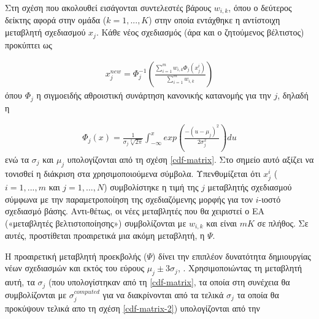 Στη σχέση που ακολουθεί εισάγονται συντελεστές βάρους $w_{i,k}$, όπου ο δεύτερος δείκτης αφορά στην ομάδα ($k=1,...,K$) στην οποία εντάχθηκε η αντίστοιχη μεταβλητή σχεδιασμού $x_j$. Κάθε νέος σχεδιασμός (άρα και ο ζητούμενος βέλτιστος) προκύπτει ως 

\begin{eqnarray}
   x_j^{new} = \Phi _j^{-1} (\frac{\sum_{i=1}^{m}w_{i,k} \Phi _j(x_j^i)}{\sum_{i=1}^{m}w_{i,k} }) 
   \label{non-linear2} 
\end{eqnarray}
όπου $\Phi_j$ η σιγμοειδής αθροιστική συνάρτηση κανονικής κατανομής για την $j$, δηλαδή η

\begin{eqnarray}
   \Phi _{j} (x)= \frac{1}{\sigma _j\sqrt[2]{2\pi}}\int _{-\infty}^x exp(\frac{-(u-\mu _j)^2}{2 \sigma _j^2 })du 
   \label{cdf} 
\end{eqnarray}
ενώ τα $\sigma _j$ και $\mu _j$ υπολογίζονται από τη σχέση \ref{cdf-matrix}. Στο σημείο αυτό αξίζει να τονισθεί η διάκριση στα χρησιμοποιούμενα σύμβολα. Υπενθυμίζεται ότι $x_j^i$ ($i=1,...,m$ και $j=1,...,N$) συμβολίστηκε η τιμή της $j$ μεταβλητής σχεδιασμού σύμφωνα με την παραμετροποίηση της  σχεδιαζόμενης μορφής για τον $i$-ιοστό σχεδιασμό βάσης. Αντι-θέτως, οι νέες μεταβλητές που θα χειριστεί ο ΕΑ («μεταβλητές βελτιστοποίησης») συμβολίζονται με $w_{i,k}$ και είναι $mK$ σε πλήθος. Σε αυτές, προστίθεται προαιρετικά μια ακόμη μεταβλητή, η $\Psi$.   
  

Η προαιρετική μεταβλητή προεκβολής ($\Psi$) δίνει την επιπλέον δυνατότητα δημιουργίας νέων σχεδιασμών και εκτός του εύρους $\mu _j \pm 3\sigma _j$, \cite{Kiemele}. Χρησιμοποιώντας τη μεταβλητή αυτή, τα $\sigma _j$  (που υπολογίστηκαν από τη \ref{cdf-matrix}, τα οποία στη συνέχεια θα συμβολίζονται με $\sigma_j^{computed}$ για να διακρίνονται από τα τελικά $\sigma _j$ τα οποία θα  προκύψουν τελικά απο τη σχέση \ref{cdf-matrix-2})  υπολογίζονται από την          

